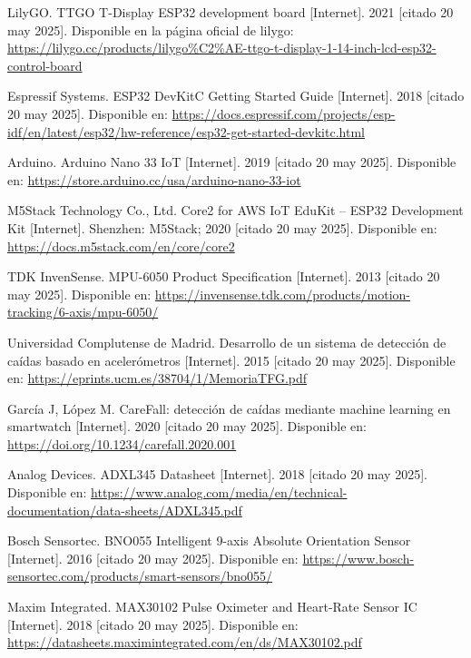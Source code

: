 \documentclass[12pt, a4paper]{article}
\begin{document}
\begin{thebibliography}{9}
	
	LilyGO. TTGO T-Display ESP32 development board [Internet]. 2021 [citado 20 may 2025]. Disponible en la página oficial de lilygo: \url{https://lilygo.cc/products/lilygo%C2%AE-ttgo-t-display-1-14-inch-lcd-esp32-control-board}
	
	Espressif Systems. ESP32 DevKitC Getting Started Guide [Internet]. 2018 [citado 20 may 2025]. Disponible en: \url{https://docs.espressif.com/projects/esp-idf/en/latest/esp32/hw-reference/esp32-get-started-devkitc.html}
	

	
	Arduino. Arduino Nano 33 IoT [Internet]. 2019 [citado 20 may 2025]. Disponible en: \url{https://store.arduino.cc/usa/arduino-nano-33-iot}


	M5Stack Technology Co., Ltd. Core2 for AWS IoT EduKit – ESP32 Development Kit [Internet]. Shenzhen: M5Stack; 2020 [citado 20 may 2025]. Disponible en: \url{https://docs.m5stack.com/en/core/core2}

	
	TDK InvenSense. MPU-6050 Product Specification [Internet]. 2013 [citado 20 may 2025]. Disponible en: \url{https://invensense.tdk.com/products/motion-tracking/6-axis/mpu-6050/}
	
	Universidad Complutense de Madrid. Desarrollo de un sistema de detección de caídas basado en acelerómetros [Internet]. 2015 [citado 20 may 2025]. Disponible en: \url{https://eprints.ucm.es/38704/1/MemoriaTFG.pdf}
	
	García J, López M. CareFall: detección de caídas mediante machine learning en smartwatch [Internet]. 2020 [citado 20 may 2025]. Disponible en: \url{https://doi.org/10.1234/carefall.2020.001}
	
	Analog Devices. ADXL345 Datasheet [Internet]. 2018 [citado 20 may 2025]. Disponible en: \url{https://www.analog.com/media/en/technical-documentation/data-sheets/ADXL345.pdf}
	
	Bosch Sensortec. BNO055 Intelligent 9-axis Absolute Orientation Sensor [Internet]. 2016 [citado 20 may 2025]. Disponible en: \url{https://www.bosch-sensortec.com/products/smart-sensors/bno055/}
	
	Maxim Integrated. MAX30102 Pulse Oximeter and Heart-Rate Sensor IC [Internet]. 2018 [citado 20 may 2025]. Disponible en: \url{https://datasheets.maximintegrated.com/en/ds/MAX30102.pdf}
	

\end{thebibliography}
\end{document}
